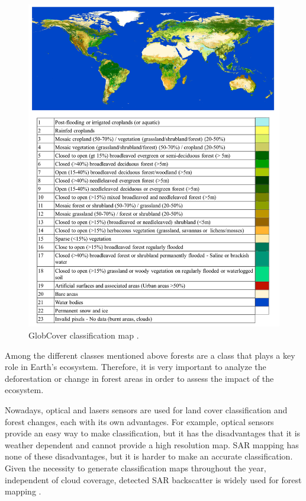 \begin{figure}[H]
    \centering
    \includegraphics[width=\linewidth]{Cap2/glob_cover.png}
    \caption{GlobCover classification map \cite{Paolathesis}.}
    \label{fig:glob_cover_map}
\end{figure}

Among the different classes mentioned above forests are a class that plays a key role in Earth's ecosystem. Therefore, it is very important to analyze the deforestation or change in forest areas in order to assess the impact of the ecosystem. 

Nowadays, optical and lasers sensors are used for land cover classification and forest changes, each with its own advantages. For example, optical sensors provide an easy way to make classification, but it has the disadvantages that it is weather dependent and cannot provide a high resolution map. SAR mapping has none of these disadvantages, but it is harder to make an accurate classification. Given the necessity to generate classification maps throughout the year, independent of cloud coverage, detected SAR backscatter is widely used for forest mapping \cite{Krieger}. 

